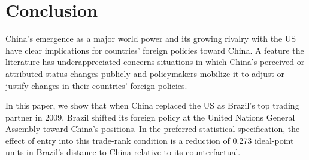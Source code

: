 \documentclass[referee,pdflatex,sn-basic]{sn-jnl}
\renewenvironment{table}[1][]{\tableorg[#1]}{\endtableorg\normalfont}
\theoremstyle{thmstylethree}
\begin{document}
\begin{table}[H]
\centering
\caption{\label{tab:public-cue-pooled-ife}Pooled interactive fixed-effects estimates for Australia, Brazil, Chile, and Uruguay.}
\centering
{}
\end{table}

\section{Conclusion}\label{conclusion}

China's emergence as a major world power and its growing rivalry with the US have clear implications for countries' foreign policies toward China. A feature the literature has underappreciated concerns situations in which China's perceived or attributed status changes publicly and policymakers mobilize it to adjust or justify changes in their countries' foreign policies.

In this paper, we show that when China replaced the US as Brazil's top trading partner in 2009, Brazil shifted its foreign policy at the United Nations General Assembly toward China's positions. In the preferred statistical specification, the effect of entry into this trade-rank condition is a reduction of 0.273 ideal-point units in Brazil's distance to China relative to its counterfactual.
\end{document}
